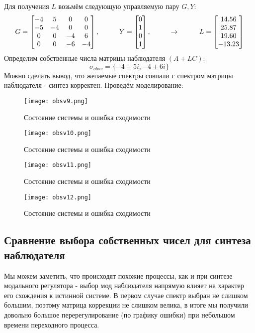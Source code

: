 Для получения $L$ возьмём следующую управляемую пару $G,Y$:
$$
G = \begin{bmatrix}
  -4  &   5  &   0  &   0 \\
  -5  &  -4   &  0   &  0 \\
  0  &   0  &  -4  &   6 \\
  0   &  0   &  -6  &  -4
\end{bmatrix}, \hspace*{1cm} Y = \begin{bmatrix} 0\\1\\0\\1 \end{bmatrix},\hspace*{1cm} \rightarrow \hspace*{1cm}
L = \begin{bmatrix}
  14.56\\25.87\\19.60\\-13.23
    \end{bmatrix}
$$
Определим собственные числа матрицы наблюдателя $(A+LC)$:
$$
    \sigma_{obsv}=\{-4 \pm 5i, -4 \pm 6i\}
$$
Можно сделать вывод, что желаемые спектры совпали с спектром матрицы наблюдателя - синтез корректен.
Проведём моделирование:
\begin{figure}[ht]
  \centering
  \texttt{[image: obsv9.png]}
  \caption{Состояние системы и ошибка сходимости}
\end{figure}
\newpage
\begin{figure}[ht]
  \centering
  \texttt{[image: obsv10.png]}
  \caption{Состояние системы и ошибка сходимости}
\end{figure}
\begin{figure}[ht]
  \centering
  \texttt{[image: obsv11.png]}
  \caption{Состояние системы и ошибка сходимости}
\end{figure}
\newpage
\begin{figure}[ht]
  \centering
  \texttt{[image: obsv12.png]}
  \caption{Состояние системы и ошибка сходимости}
\end{figure}


\newpage
\subsection{Сравнение выбора собственных чисел для синтеза наблюдателя}
Мы можем заметить, что происходят похожие процессы, как и при синтезе модального регулятора - выбор мод наблюдателя напрямую влияет на характер его схождения к истинной системе.
В первом случае спектр выбран не слишком большим, поэтому матрица коррекции не слишком велика, в итоге мы получили довольно большое перерегулирование (по графику ошибки) при небольшом времени переходного процесса.

